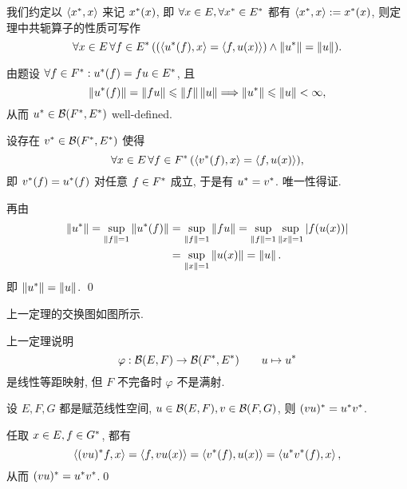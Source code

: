 我们约定以 $ \left\langle x^{*}, x \right\rangle $ 来记 $ x^{*}(x) $, 即 $ \forall x\in E, \forall x^{*}\in E^{*} $ 都有 $ \left\langle x^{*}, x \right\rangle:=x^{*}(x) $, 则定理中共轭算子的性质可写作
\[
	\forall x\in E\,\forall f\in E^{*}\,((\left\langle u^{*}(f), x \right\rangle=\left\langle f, u(x) \right\rangle)\land\left\| u^{*} \right\|=\left\| u \right\|).
\]
\begin{Proof}
	由题设 $ \forall f\in F^{*}: u^{*}(f)=fu\in E^{*} $, 且
	\[
		\left\| u^{*}(f) \right\|=\left\| fu \right\|\leqslant\left\| f \right\|\left\| u \right\|\Longrightarrow\left\| u^{*} \right\|\leqslant\left\| u \right\|<\infty,
	\]
	从而 $ u^{*}\in\mathcal{B}(F^{*}, E^{*}) $ well-defined.

	设存在 $ v^{*}\in\mathcal{B}(F^{*}, E^{*}) $ 使得
	\[
		\forall x\in E\,\forall f\in F^{*}\,(\left\langle v^{*}(f), x \right\rangle=\left\langle f, u(x) \right\rangle),
	\]
	即 $ v^{*}(f)=u^{*}(f) $ 对任意 $ f\in F^{*} $ 成立, 于是有 $ u^{*}=v^{*} $. 唯一性得证.

	再由
	\[
		\begin{aligned}
			\left\| u^{*} \right\|=\sup_{\left\| f \right\|=1}\left\| u^{*}(f) \right\| & = \sup_{\left\| f \right\|=1}\left\| fu \right\|=\sup_{\left\| f \right\|=1}\sup_{\left\| x \right\|=1}\left| f(u(x)) \right|  \\
			                                                    & = \sup_{\left\| x \right\|=1}\left\| u(x) \right\|=\left\| u \right\|.
		\end{aligned}
	\]
	即 $ \left\| u^{*} \right\|=\left\| u \right\| $. \qed
\end{Proof}

上一定理的交换图如图所示.
\begin{center}
\end{center}
\begin{Remark}
	上一定理说明
	\[
		\varphi:\mathcal{B}(E, F)\to \mathcal{B}(F^{*}, E^{*})\qquad u\mapsto u^{*}
	\]
	是线性等距映射, 但 $ F $ 不完备时 $ \varphi $ 不是满射.
\end{Remark}

\begin{Proposition}
	设 $ E, F, G $ 都是赋范线性空间, $ u\in\mathcal{B}(E, F), v\in\mathcal{B}(F, G) $, 则 $ (vu)^{*}=u^{*}v^{*} $.
\end{Proposition}
\begin{Proof}
	任取 $ x\in E, f\in G^{*} $, 都有
	\[
		\left\langle (vu)^{*}f, x \right\rangle=\left\langle f, vu(x) \right\rangle=\left\langle v^{*}(f), u(x) \right\rangle=\left\langle u^{*}v^{*}(f), x \right\rangle,
	\]
	从而 $ (vu)^{*}=u^{*}v^{*} $.\qed
\end{Proof}

